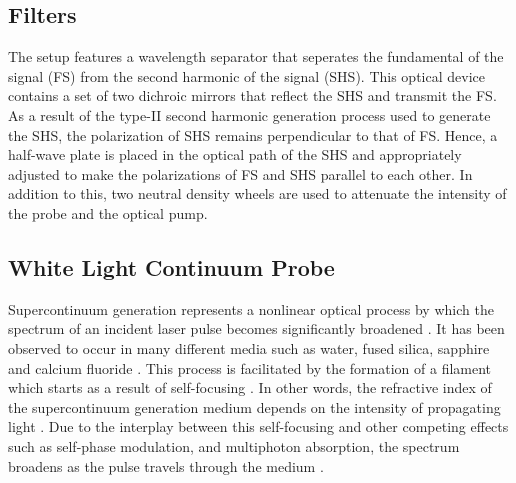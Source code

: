 \subsection{Filters}

The setup features a wavelength separator that seperates the fundamental of the signal (FS) from the second harmonic of the signal (SHS). This optical device contains a set of two dichroic mirrors that reflect the SHS and transmit the FS. As a result of the type-II second harmonic generation process used to generate the SHS, the polarization of SHS remains perpendicular to that of FS. Hence, a half-wave plate is placed in the optical path of the SHS and appropriately adjusted to make the polarizations of FS and SHS parallel to each other. In addition to this, two neutral density wheels are used to attenuate the intensity of the probe and the optical pump.

\subsection{White Light Continuum Probe}

\label{section:white_light_probe}
Supercontinuum generation represents a nonlinear optical process by which the spectrum of an incident laser pulse becomes significantly broadened \cite{dubietis2017ultrafast}. It has been observed to occur in many different media such as water, fused silica, sapphire and calcium fluoride \cite{dubietis2017ultrafast}. This process is facilitated by the formation of a filament which starts as a result of self-focusing \cite{dubietis2017ultrafast}. In other words, the refractive index of the supercontinuum generation medium depends on the intensity of propagating light \cite{dubietis2017ultrafast}. Due to the interplay between this self-focusing and other competing effects such as self-phase modulation, and multiphoton absorption, the spectrum  broadens as the pulse travels through the medium \cite{dubietis2017ultrafast}.

